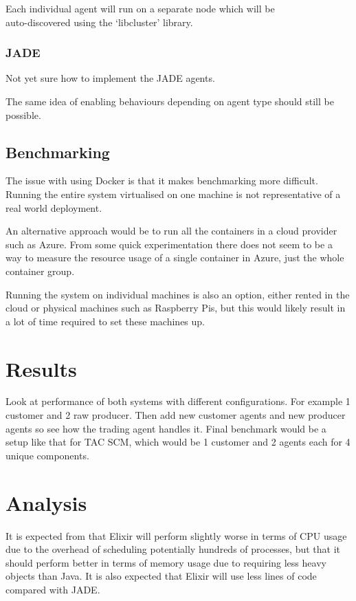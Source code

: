 \documentclass[12pt,a4paper]{article}
\begin{document}
Each individual agent will run on a separate node which will be\\auto-discovered using the `libcluster' library.

\subsubsection{JADE}

Not yet sure how to implement the JADE agents.

The same idea of enabling behaviours depending on agent type should still be possible.

\subsection{Benchmarking}

The issue with using Docker is that it makes benchmarking more difficult.
Running the entire system virtualised on one machine is not representative of a real world deployment.

An alternative approach would be to run all the containers in a cloud provider such as Azure.
From some quick experimentation there does not seem to be a way to measure the resource usage of a single container in Azure, just the whole container group.

Running the system on individual machines is also an option, either rented in the cloud or physical machines such as Raspberry Pis, but this would likely result in a lot of time required to set these machines up.

\section{Results}

Look at performance of both systems with different configurations.
For example 1 customer and 2 raw producer.
Then add new customer agents and new producer agents so see how the trading agent handles it.
Final benchmark would be a setup like that for TAC SCM, which would be 1 customer and 2 agents each for 4 unique components.

\section{Analysis}

It is expected from  that Elixir will perform slightly worse in terms of CPU usage due to the overhead of scheduling potentially hundreds of processes, but that it should perform better in terms of memory usage due to requiring less heavy objects than Java.
It is also expected that Elixir will use less lines of code compared with JADE\@.
\end{document}
